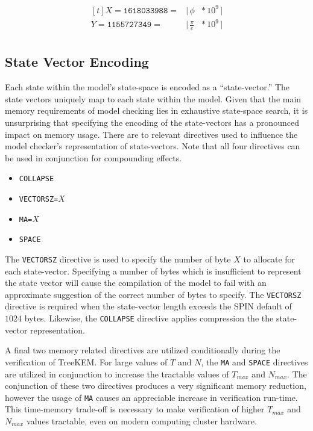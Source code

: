 \begin{equation}
\begin{aligned}[t]
X = \texttt{1618033988} = & \bigg | \, \phi          \!\!\!\! & * \, 10^9 \, \bigg |\\
Y = \texttt{1155727349} = & \bigg | \, \frac{\pi}{e} \!\!\!\! & * \, 10^9 \, \bigg |\\
\end{aligned}
\end{equation}


\hypertarget{state-vector-encoding}{%
\subsection{State Vector Encoding}\label{state-vector-encoding}}

Each state within the model's state-space is encoded as a ``state-vector.''
The state vectors uniquely map to each state within the model.
Given that the main memory requirements of model checking lies in exhaustive state-space search, it is unsurprising that specifying the encoding of the state-vectors has a pronounced impact on memory usage.
There are to relevant directives used to influence the model checker's representation of state-vectors.
Note that all four directives can be used in conjunction for compounding effects.

\begin{itemize}
\item
  \texttt{COLLAPSE}
\item
  \texttt{VECTORSZ=}\(X\)
\item
  \texttt{MA=}\(X\)
\item
  \texttt{SPACE}
\end{itemize}

The \texttt{VECTORSZ} directive is used to specify the number of byte \(X\) to allocate for each state-vector.
Specifying a number of bytes which is insufficient to represent the state vector will cause the compilation of the model to fail with an approximate suggestion of the correct number of bytes to specify.
The \texttt{VECTORSZ} directive is required when the state-vector length exceeds the SPIN default of \(1024\) bytes.
Likewise, the \texttt{COLLAPSE} directive applies compression the the state-vector representation.

A final two memory related directives are utilized conditionally during the verification of TreeKEM.
For large values of \(T\) and \(N\), the \texttt{MA} and \texttt{SPACE} directives are utilized in conjunction to increase the tractable values of \(T_{max}\) and \(N_{max}\).
The conjunction of these two directives produces a very significant memory reduction, however the usage of \texttt{MA} causes an appreciable increase in verification run-time.
This time-memory trade-off is necessary to make verification of higher \(T_{max}\) and \(N_{max}\) values tractable, even on modern computing cluster hardware.

